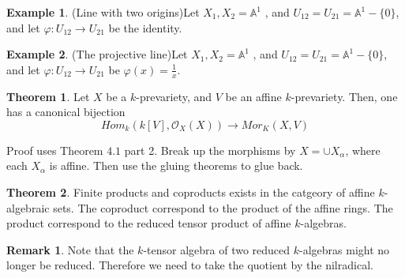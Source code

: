 \documentclass{article}
\theoremstyle{definition}
\newtheorem{theorem}{Theorem}[section]
\theoremstyle{definition}
\theoremstyle{definition}
\newtheorem{remark}{Remark}[theorem]
\theoremstyle{definition}
\theoremstyle{definition}
\theoremstyle{definition}
\theoremstyle{definition}
\newtheorem{example}{Example}[theorem]
\begin{document}
\begin{tcolorbox}[colback=yellow!5!white,colframe=yellow!30!white]
\begin{example}
(Line with two origins)Let $X_1,X_2=\mathbb{A}^1$ , and $U_{12}=U_{21}=\mathbb{A}^1-\{0\}$, and let $\varphi: U_{12}\to U_{21}$ be the identity. 
\end{example}
\end{tcolorbox}


\begin{tcolorbox}[colback=yellow!5!white,colframe=yellow!30!white]
\begin{example}
    (The projective line)Let $X_1,X_2=\mathbb{A}^1$ , and $U_{12}=U_{21}=\mathbb{A}^1-\{0\}$, and let $\varphi: U_{12}\to U_{21}$ be $\varphi(x)=\frac{1}{x}$. 
\end{example}
\end{tcolorbox}


\begin{tcolorbox}[colback=red!5!white,colframe=red!30!white]
\begin{theorem}
Let $X$ be a $k$-prevariety, and $V$ be an affine $k$-prevariety. Then, one has a canonical bijection
\[Hom_k(k[V], \mathcal{O}_X(X))\to Mor_K(X, V)\]
\end{theorem}
\end{tcolorbox}
Proof uses Theorem $4.1$ part 2. Break up the morphisms by $X=\cup X_{\alpha}$, where each $X_{\alpha}$ is affine. Then use the gluing theorems to glue back. 

\begin{tcolorbox}[colback=red!5!white,colframe=red!30!white]
\begin{theorem}
Finite products and coproducts exists in the catgeory of affine $k$-algebraic sets. The coproduct correspond to the product of the affine rings. The product correspond to the reduced tensor product of affine $k$-algebras.
\end{theorem}
\end{tcolorbox}

\begin{tcolorbox}[colback=green!5!white,colframe=green!30!white]
\begin{remark}
    Note that the $k$-tensor algebra of two reduced $k$-algebras might no longer be reduced. Therefore we need to take the quotient by the nilradical. 
\end{remark}
\end{tcolorbox}
\end{document}
